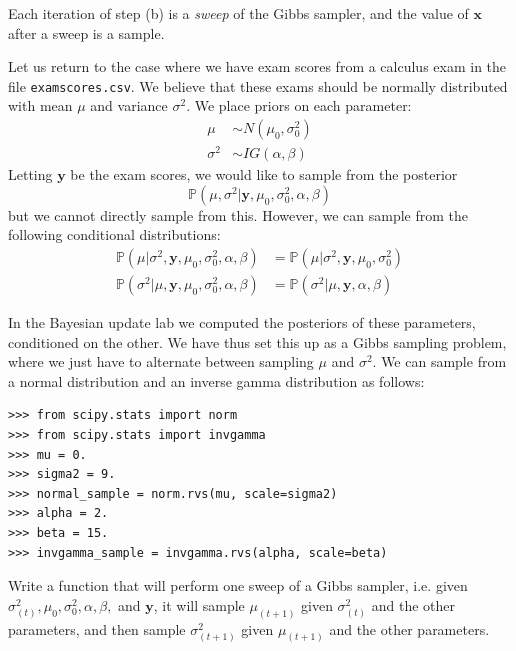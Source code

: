 Each iteration of step (b) is a \emph{sweep} of the Gibbs sampler, and the value of $\mathbf{x}$ after a sweep is a sample.

Let us return to the case where we have exam scores from a calculus exam in the file \texttt{examscores.csv}. We believe that these exams should be normally distributed with mean $\mu$ and variance $\sigma^{2}$. We place priors on each parameter:
\begin{align*}
\mu & \sim N(\mu_{0}, \sigma_{0}^{2}) \\
\sigma^{2} & \sim IG(\alpha, \beta)
\end{align*}
Letting $\mathbf{y}$ be the exam scores, we would like to sample from the posterior
\begin{equation*}
\mathbb{P}(\mu, \sigma^{2} | \mathbf{y}, \mu_{0}, \sigma_{0}^{2}, \alpha, \beta)
\end{equation*}
but we cannot directly sample from this. However, we can sample from the following conditional distributions:
\begin{align*}
\mathbb{P}(\mu | \sigma^{2}, \mathbf{y}, \mu_{0}, \sigma_{0}^{2}, \alpha, \beta) & = \mathbb{P}(\mu | \sigma^{2}, \mathbf{y}, \mu_{0}, \sigma_{0}^{2})\\
\mathbb{P}(\sigma^{2} | \mu, \mathbf{y}, \mu_{0}, \sigma_{0}^{2}, \alpha, \beta) & = \mathbb{P}(\sigma^{2} | \mu, \mathbf{y}, \alpha, \beta)
\end{align*}

In the Bayesian update lab we computed the posteriors of these parameters, conditioned on the other. We have thus set this up as a Gibbs sampling problem, where we just have to alternate between sampling $\mu$ and $\sigma^{2}$. We can sample from a normal distribution and an inverse gamma distribution as follows:
\begin{lstlisting}
>>> from scipy.stats import norm
>>> from scipy.stats import invgamma
>>> mu = 0.
>>> sigma2 = 9.
>>> normal_sample = norm.rvs(mu, scale=sigma2)
>>> alpha = 2.
>>> beta = 15.
>>> invgamma_sample = invgamma.rvs(alpha, scale=beta)
\end{lstlisting}

\begin{problem}
Write a function that will perform one sweep of a Gibbs sampler, i.e. given $\sigma_{(t)}^{2}, \mu_{0}, \sigma_{0}^{2}, \alpha, \beta,$ and $\mathbf{y}$, it will sample $\mu_{(t+1)}$ given $\sigma_{(t)}^{2}$ and the other parameters, and then sample $\sigma_{(t+1)}^{2}$ given $\mu_{(t+1)}$ and the other parameters.
\end{problem}

